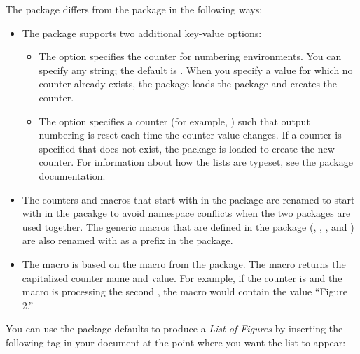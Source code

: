 \documentclass[article,oneside]{memoir}
\begin{document}
     The  package differs from the  package in the following ways:
    \begin{itemize}
      \item The  package supports two additional key-value options:
      \begin{itemize}
        \item The  option specifies the counter for numbering
         environments.
              You can specify any string; the default is .
              When you specify a  value for which no counter already exists, the
               package loads the  package and creates the counter.

       \item The  option specifies a counter (for example,
             ) such
             that output numbering is reset each time the counter value changes.
             If a counter is specified that does not exist, the  package is
             loaded to create the new counter.
             For information about how the lists are typeset,
             see the  package documentation.
      \end{itemize}
      \item The counters and macros that start with  in the  package
            are renamed to start with  in the  pacakge to avoid
            namespace conflicts when the two packages are used together.
            The generic macros that are defined in the  package
            (, , , and ) are
            also renamed with  as a prefix in the  package.

      \item The  macro is based on the  macro from
            the  package. The   macro returns the capitalized
            counter name and value. For example, if the counter is  and the
            macro is processing the second , the  macro
            would contain the value ``Figure 2.''

  \end{itemize}
    You can use the  package defaults to produce a \emph{List of Figures}
    by inserting the following tag in your document at the point where you want
    the list to appear:
\end{document}

